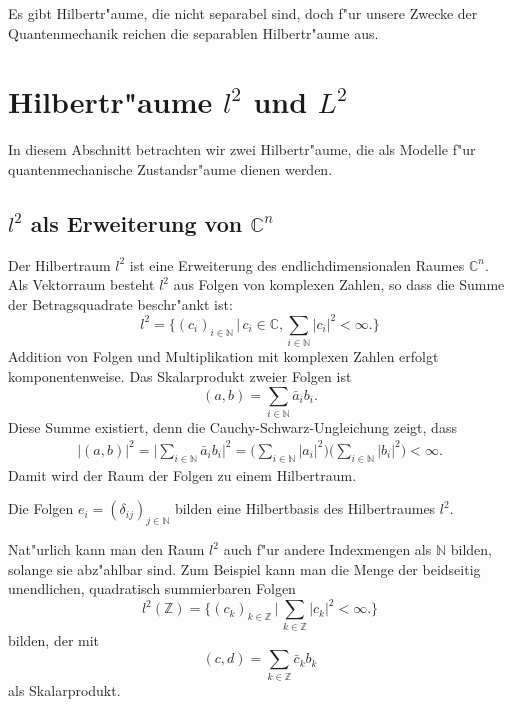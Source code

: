 Es gibt Hilbertr"aume, die nicht separabel sind, doch f"ur unsere Zwecke
der Quantenmechanik reichen die separablen Hilbertr"aume aus.

%
%
\section{Hilbertr"aume $l^2$ und $L^2$}
In diesem Abschnitt betrachten wir zwei Hilbertr"aume, die als 
Modelle f"ur quantenmechanische Zustandsr"aume dienen werden.

\subsection{$l^2$ als Erweiterung von $\mathbb C^n$}
Der Hilbertraum $l^2$ ist eine Erweiterung des endlichdimensionalen
Raumes $\mathbb C^n$.
Als Vektorraum besteht $l^2$ aus Folgen von komplexen Zahlen,
so dass die Summe der Betragsquadrate beschr"ankt ist:
\[
l^2=\biggl\{
(c_i)_{i\in\mathbb N}\,\biggl|\,c_i\in\mathbb C,
\sum_{i\in\mathbb N} |c_i|^2 <\infty
\biggr.\biggr\}
\]
Addition von Folgen und Multiplikation mit komplexen Zahlen erfolgt 
komponentenweise.
Das Skalarprodukt zweier Folgen ist
\[
(a, b)=\sum_{i\in\mathbb N} \bar a_i b_i.
\]
Diese Summe existiert, denn die Cauchy-Schwarz-Ungleichung zeigt,
dass
\begin{align*}
|(a,b)|^2
=
\biggl|
\sum_{i\in\mathbb N} \bar a_ib_i
\biggr|^2
=
\biggl(
\sum_{i\in\mathbb N} |a_i|^2
\biggr)
\biggl(
\sum_{i\in\mathbb N} |b_i|^2
\biggr)
<\infty.
\end{align*}
Damit wird der Raum der Folgen zu einem Hilbertraum.

Die Folgen $e_i=(\delta_{ij})_{j\in\mathbb N}$ bilden eine Hilbertbasis
des Hilbertraumes $l^2$. 

Nat"urlich kann man den Raum $l^2$ auch f"ur andere Indexmengen als
$\mathbb N$ bilden, solange sie abz"ahlbar sind. Zum Beispiel kann man
die Menge der beidseitig unendlichen, quadratisch summierbaren Folgen
\[
l^2(\mathbb Z)=
\biggl\{
(c_k)_{k\in\mathbb Z}\,\biggl|\,
\sum_{k\in\mathbb Z}|c_k|^2<\infty
\biggr.
\biggr\}
\]
bilden, der mit
\[
(c,d)=\sum_{k\in\mathbb Z} \bar c_kb_k
\]
als Skalarprodukt.

